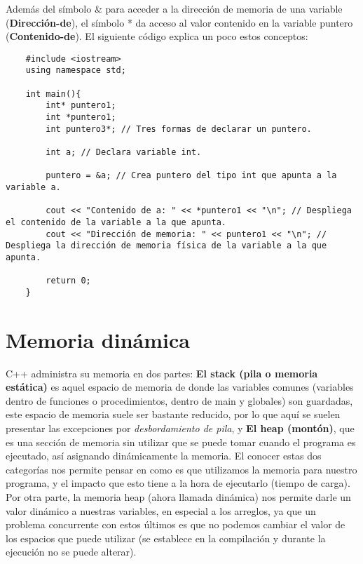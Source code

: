 Además del símbolo \& para acceder a la dirección de memoria de una variable (\textbf{Dirección-de}), el símbolo * da acceso al valor contenido en la variable puntero (\textbf{Contenido-de}). El siguiente código explica un poco estos conceptos:
\begin{lstlisting}
    #include <iostream>
    using namespace std;
    
    int main(){
        int* puntero1;
        int *puntero1;
        int puntero3*; // Tres formas de declarar un puntero.
    
        int a; // Declara variable int.
    
        puntero = &a; // Crea puntero del tipo int que apunta a la variable a.
    
        cout << "Contenido de a: " << *puntero1 << "\n"; // Despliega el contenido de la variable a la que apunta.
        cout << "Dirección de memoria: " << puntero1 << "\n"; // Despliega la dirección de memoria física de la variable a la que apunta.
        
        return 0;
    }
\end{lstlisting}



\section{Memoria dinámica}

C++ administra su memoria en dos partes: \textbf{El stack (pila o memoria estática)} es aquel espacio de memoria de donde las variables comunes (variables dentro de funciones o procedimientos, dentro de main y globales) son guardadas, este espacio de memoria suele ser bastante reducido, por lo que aquí se suelen presentar las excepciones por \textit{desbordamiento de pila}, y \textbf{El heap (montón)}, que es una sección de memoria sin utilizar que se puede tomar cuando el programa es ejecutado, así asignando dinámicamente la memoria. El conocer estas dos categorías nos permite pensar en como es que utilizamos la memoria para nuestro programa, y el impacto que esto tiene a la hora de ejecutarlo (tiempo de carga). Por otra parte, la memoria heap (ahora llamada dinámica) nos permite darle un valor dinámico a nuestras variables, en especial a los arreglos, ya que un problema concurrente con estos últimos es que no podemos cambiar el valor de los espacios que puede utilizar (se establece en la compilación y durante la ejecución no se puede alterar).

